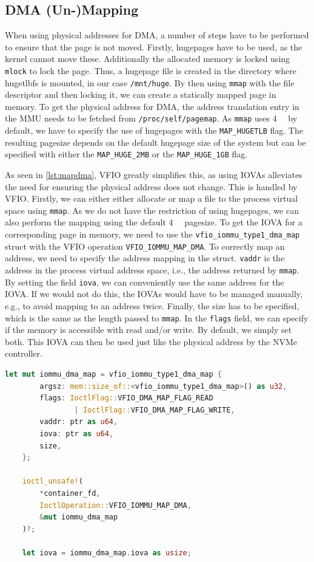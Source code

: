\subsection{DMA (Un-)Mapping}\label{sec:dmamapping}
When using physical addresses for DMA, a number of steps have to be performed to ensure that the page is not moved. Firstly, hugepages have to be used, as the kernel cannot move these. Additionally the allocated memory is locked using \texttt{mlock} to lock the page. Thus, a hugepage file is created in the directory where hugetlbfs is mounted, in our case \texttt{/mnt/huge}. By then using \texttt{mmap} with the file descriptor and then locking it, we can create a statically mapped page in memory. To get the physical address for DMA, the address translation entry in the MMU needs to be fetched from \texttt{/proc/self/pagemap}. As \texttt{mmap} uses \qty{4}{\kibi\byte} by default, we have to specify the use of hugepages with the \texttt{MAP\_HUGETLB} flag. The resulting pagesize depends on the default hugepage size of the system but can be specified with either the \texttt{MAP\_HUGE\_2MB} or the \texttt{MAP\_HUGE\_1GB} flag.

As seen in \autoref{lst:mapdma}, VFIO greatly simplifies this, as using IOVAs alleviates the need for ensuring the physical address does not change. This is handled by VFIO. Firstly, we can either either allocate or map a file to the process virtual space using \texttt{mmap}. As we do not have the restriction of using hugepages, we can also perform the mapping using the default \qty{4}{\kibi\byte} pagesize.
To get the IOVA for a corresponding page in memory, we need to use the \texttt{vfio\_iommu\_type1\_dma\_map} struct with the VFIO operation \texttt{VFIO\_IOMMU\_MAP\_DMA}. To correctly map an address, we need to specify the address mapping in the struct. \texttt{vaddr} is the address in the process virtual address space, i.e., the address returned by \texttt{mmap}. By setting the field \texttt{iova}, we can conveniently use the same address for the IOVA. If we would not do this, the IOVAs would have to be managed manually, e.g., to avoid mapping to an address twice. Finally, the size has to be specified, which is the same as the length passed to \texttt{mmap}. In the \texttt{flags} field, we can specify if the memory is accessible with read and/or write. By default, we simply set both. This IOVA can then be used just like the physical address by the NVMe controller.

\begin{lstlisting}[language=Rust,caption={Mapping memory for DMA}, label=lst:mapdma]
    let mut iommu_dma_map = vfio_iommu_type1_dma_map {
        argsz: mem::size_of::<vfio_iommu_type1_dma_map>() as u32,
        flags: IoctlFlag::VFIO_DMA_MAP_FLAG_READ 
                | IoctlFlag::VFIO_DMA_MAP_FLAG_WRITE,
        vaddr: ptr as u64,
        iova: ptr as u64,
        size,
    };

    ioctl_unsafe!(
        *container_fd,
        IoctlOperation::VFIO_IOMMU_MAP_DMA,
        &mut iommu_dma_map
    )?;

    let iova = iommu_dma_map.iova as usize; 
\end{lstlisting}

